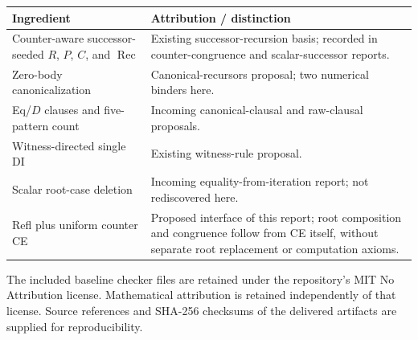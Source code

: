\documentclass[11pt,letterpaper]{article}
\theoremstyle{definition}
\newcommand{\Rec}{\mathop{\mathrm{Rec}}}
\begin{document}
\begin{center}\small
\begin{tabular}{@{}p{.36\linewidth}p{.57\linewidth}@{}}
\toprule
Ingredient & Attribution / distinction\\
\midrule
Counter-aware successor-seeded $R$, $P$, $C$, and $\Rec$ & Existing successor-recursion basis; recorded in counter-congruence and scalar-successor reports.\\
Zero-body canonicalization & Canonical-recursors proposal; two numerical binders here.\\
Eq/$D$ clauses and five-pattern count & Incoming canonical-clausal and raw-clausal proposals.\\
Witness-directed single DI & Existing witness-rule proposal.\\
Scalar root-case deletion & Incoming equality-from-iteration report; not rediscovered here.\\
Refl plus uniform counter CE & Proposed interface of this report; root composition and congruence follow from CE itself, without separate root replacement or computation axioms.\\
\bottomrule
\end{tabular}
\end{center}

The included baseline checker files are retained under the repository's
MIT No Attribution license. Mathematical attribution is retained
independently of that license. Source references and SHA-256 checksums
of the delivered artifacts are supplied for reproducibility.
\end{document}
